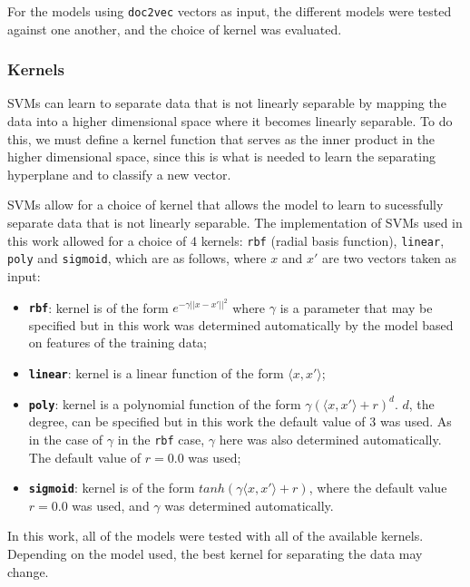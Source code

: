 \documentclass[twocolumn]{article}
\begin{document}
For the models using \texttt{doc2vec} vectors as input, the different models were tested against one another, and the choice of kernel was evaluated.

\subsubsection{Kernels}

SVMs can learn to separate data that is not linearly separable by mapping the data into a higher dimensional space where it becomes linearly separable. To do this, we must define a kernel function that serves as the inner product in the higher dimensional space, since this is what is needed to learn the separating hyperplane and to classify a new vector.

SVMs allow for a choice of kernel that allows the model to learn to sucessfully separate data that is not linearly separable. The implementation of SVMs used in this work allowed for a choice of 4 kernels: \texttt{rbf} (radial basis function), \texttt{linear}, \texttt{poly} and \texttt{sigmoid}, which are as follows, where $x$ and $x'$ are two vectors taken as input:

\begin{itemize}
	\item \textbf{\texttt{rbf}}: kernel is of the form $e^{-\gamma||x-x'||^2}$ where $\gamma$ is a parameter that may be specified but in this work was determined automatically by the model based on features of the training data;
	\item \textbf{\texttt{linear}}: kernel is a linear function of the form $\langle x, x' \rangle$;
	\item \textbf{\texttt{poly}}: kernel is a polynomial function of the form $\gamma(\langle x, x' \rangle + r)^d$. $d$, the degree, can be specified but in this work the default value of 3 was used. As in the case of $\gamma$ in the \texttt{rbf} case, $\gamma$ here was also determined automatically. The default value of $r=0.0$ was used;
	\item \textbf{\texttt{sigmoid}}: kernel is of the form $tanh(\gamma \langle x, x' \rangle + r)$, where the default value $r=0.0$ was used, and $\gamma$ was determined automatically.
\end{itemize}

In this work, all of the models were tested with all of the available kernels. Depending on the model used, the best kernel for separating the data may change.
\end{document}
